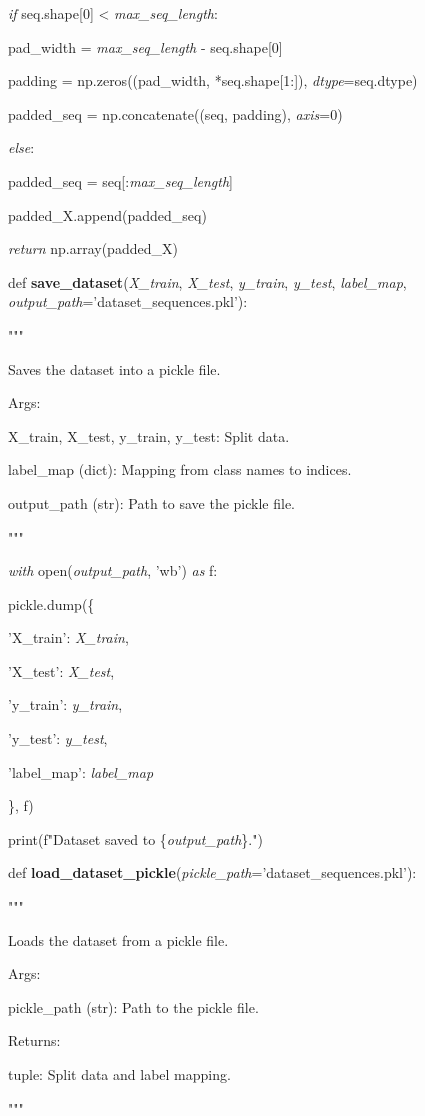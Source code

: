 \documentclass[
]{article}
\begin{document}
\emph{if} seq.shape{[}0{]} \textless{} \emph{max\_seq\_length}:

pad\_width = \emph{max\_seq\_length} - seq.shape{[}0{]}

padding = np.zeros((pad\_width, *seq.shape{[}1:{]}), \emph{dtype}=seq.dtype)

padded\_seq = np.concatenate((seq, padding), \emph{axis}=0)

\emph{else}:

padded\_seq = seq{[}:\emph{max\_seq\_length}{]}

padded\_X.append(padded\_seq)

\emph{return} np.array(padded\_X)

def \textbf{save\_dataset}(\emph{X\_train}, \emph{X\_test}, \emph{y\_train}, \emph{y\_test}, \emph{label\_map}, \emph{output\_path}='dataset\_sequences.pkl'):

"""

Saves the dataset into a pickle file.

Args:

X\_train, X\_test, y\_train, y\_test: Split data.

label\_map (dict): Mapping from class names to indices.

output\_path (str): Path to save the pickle file.

"""

\emph{with} open(\emph{output\_path}, 'wb') \emph{as} f:

pickle.dump(\{

'X\_train': \emph{X\_train},

'X\_test': \emph{X\_test},

'y\_train': \emph{y\_train},

'y\_test': \emph{y\_test},

'label\_map': \emph{label\_map}

\}, f)

print(f"Dataset saved to \{\emph{output\_path}\}.")

def \textbf{load\_dataset\_pickle}(\emph{pickle\_path}='dataset\_sequences.pkl'):

"""

Loads the dataset from a pickle file.

Args:

pickle\_path (str): Path to the pickle file.

Returns:

tuple: Split data and label mapping.

"""
\end{document}
